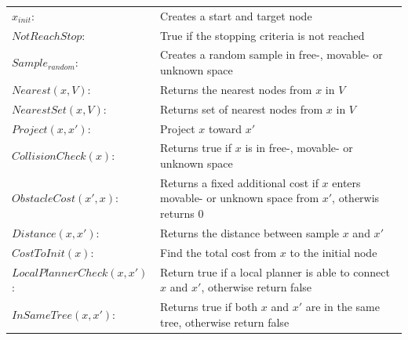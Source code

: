 \begin{center}
\begin{tabular}[t]{l p{10cm}}
$x_{init}$:& Creates a start and target node\\ 
$NotReachStop$:& True if the stopping criteria is not reached\\ 
$Sample_{random}$:& Creates a random sample in free-, movable- or unknown space\\
$Nearest(x, V)$:& Returns the nearest nodes from $x$ in $V$\\
$NearestSet(x, V)$:& Returns set of nearest nodes from $x$ in $V$\\
$Project(x, x')$:& Project $x$ toward $x'$\\
$CollisionCheck(x)$:& Returns true if $x$ is in free-, movable- or unknown space\\
$ObstacleCost(x', x)$:& Returns a fixed additional cost if $x$ enters movable- or unknown space from $x'$, otherwis returns 0\\
$Distance(x, x')$:& Returns the distance between sample $x$ and $x'$\\
$CostToInit(x)$:& Find the total cost from $x$ to the initial node\\
$LocalPlannerCheck(x, x')$:& Return true if a local planner is able to connect $x$ and $x'$, otherwise return false \\
$InSameTree(x, x')$:& Returns true if both $x$ and $x'$ are in the same tree, otherwise return false\\
\end{tabular}
\end{center}


